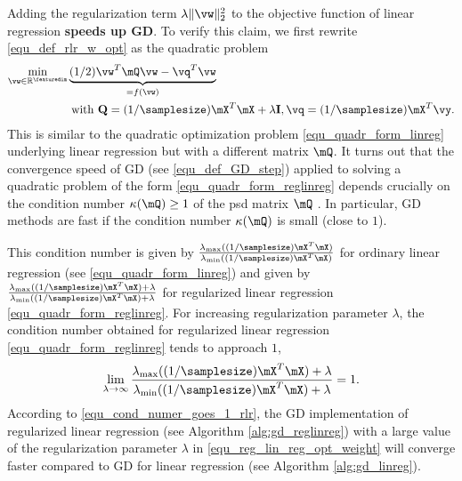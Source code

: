 \documentclass[12pt]{report}
\begin{document}
Adding the regularization term $\lambda \| \vw \|^{2}_{2}$ to the objective 
function of linear regression {\bf speeds up GD}. To verify this claim, we first 
rewrite \eqref{equ_def_rlr_w_opt} as the quadratic problem 
\begin{align} 
\label{equ_quadr_form_reglinreg}
\min_{\vw \in \mathbb{R}^{\featuredim}} & \underbrace{(1/2) \vw^{T} \mQ \vw - \vq^{T}  \vw}_{= f(\vw)} \nonumber \\ 
 & \mbox{ with } \mathbf{Q}= (1/\samplesize) \mX^{T} \mX + \lambda \mathbf{I}, \vq =(1/\samplesize) \mX^{T} \vy. %
\end{align} 
This is similar to the quadratic optimization problem \eqref{equ_quadr_form_linreg} 
underlying linear regression but with a different matrix $\mQ$. It turns out 
that the convergence speed of GD (see \eqref{equ_def_GD_step}) applied 
to solving a quadratic problem of the form \eqref{equ_quadr_form_reglinreg} 
depends crucially on the condition number $\kappa(\mQ) \geq 1$ of the 
psd matrix $\mQ$ \cite{JungFixedPoint}. In particular, GD methods are fast 
if the condition number $\kappa(\mQ)$ is small (close to $1$). 

This condition number is given by $\frac{\lambda_{\rm max}((1/\samplesize) \mX^{T} \mX)} {\lambda_{\rm min}((1/\samplesize) \mX^{T} \mX)}$ for ordinary linear regression 
(see \eqref{equ_quadr_form_linreg}) and given by $\frac{\lambda_{\rm max}((1/\samplesize)\mX^{T} \mX) + \lambda} {\lambda_{\rm min}((1/\samplesize)\mX^{T} \mX)+ \lambda}$ 
for regularized linear regression \eqref{equ_quadr_form_reglinreg}. For increasing 
regularization parameter $\lambda$, the condition number obtained for regularized 
linear regression \eqref{equ_quadr_form_reglinreg} tends to approach $1$, 
\begin{equation}
\label{equ_cond_numer_goes_1_rlr}
\lim_{\lambda \rightarrow \infty} \frac{\lambda_{\rm max}((1/\samplesize)\mX^{T} \mX) + \lambda} {\lambda_{\rm min}((1/\samplesize)\mX^{T} \mX)+ \lambda} =1. 
\end{equation} 
According to \eqref{equ_cond_numer_goes_1_rlr}, the GD 
implementation of regularized linear regression (see Algorithm \ref{alg:gd_reglinreg}) 
with a large value of the regularization parameter $\lambda$ 
in \eqref{equ_reg_lin_reg_opt_weight} will converge faster compared 
to GD for linear regression (see Algorithm \ref{alg:gd_linreg}). 
\end{document}

